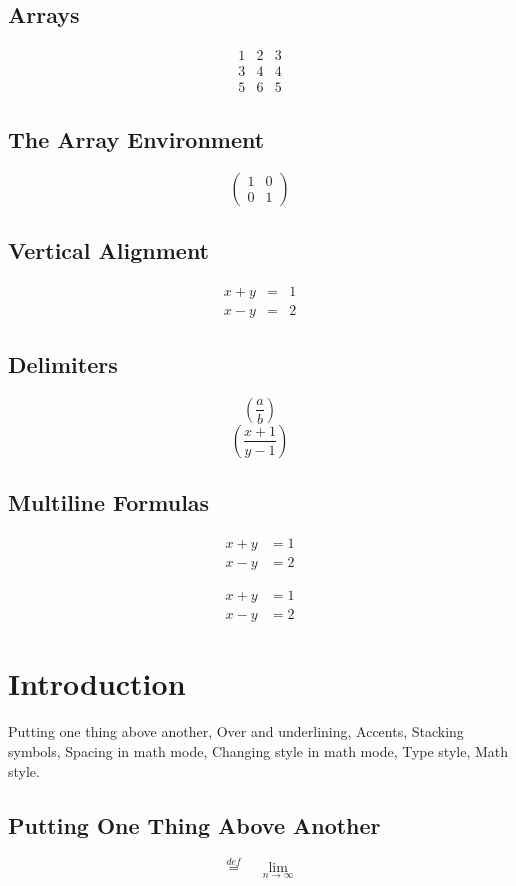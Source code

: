 \documentclass{article}
\begin{document}
\subsection{Arrays}
\[
\begin{array}{ccc}
    1 & 2 & 3 \\
    3 & 4  & 4\\
    5 & 6 & 5
\end{array}
\]
\subsection{The Array Environment}
\[
\left(
\begin{array}{cc}
    1 & 0 \\
    0 & 1
\end{array}
\right)
\]
\subsection{Vertical Alignment}
\[
\begin{array}{ccc}
   x+y  & =& 1 \\
   x-y  & =& 2
\end{array}
\]

\subsection{Delimiters}
\[
\left(\frac{a}{b} \right)
\]
\[
\left( \frac{x+1}{y-1} \right) 
\]

\subsection{Multiline Formulas}
\begin{align}
    x+y&=1\\
    x-y&=2
\end{align}

\begin{align}
    x+y&=1\\
    x-y&=2
\end{align}
\section{Introduction}
Putting one thing above another, Over and underlining, Accents, Stacking symbols, Spacing in math mode, Changing style in math mode, Type style, Math style. 

\subsection{Putting One Thing Above Another}
\[
\overset{def}{=} \quad \underset{n \to \infty}{\lim}
\]
\end{document}
